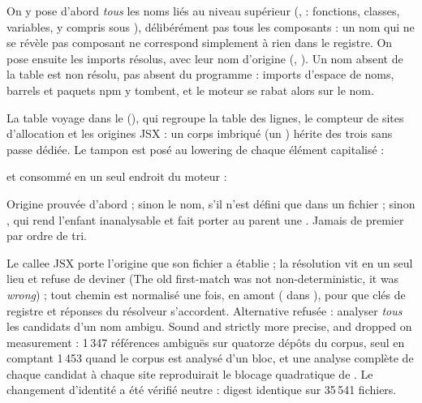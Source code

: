 
On y pose d'abord \emph{tous} les noms liés au niveau supérieur (,  : fonctions, classes, variables, y compris sous ), délibérément pas \og tous les composants\fg{} : un nom qui ne se révèle pas composant ne correspond simplement à rien dans le registre. On pose ensuite les imports résolus, avec leur nom d'origine (, ). Un nom absent de la table est \og non résolu\fg{}, pas absent du programme : imports d'espace de noms, barrels et paquets npm y tombent, et le moteur se rabat alors sur le nom.

La table voyage dans le  (), qui regroupe la table des lignes, le compteur de sites d'allocation et les origines JSX : un corps imbriqué (un ) hérite des trois sans passe dédiée. Le tampon est posé au lowering de chaque élément capitalisé :


\noindent et consommé en un seul endroit du moteur :


Origine prouvée d'abord ; sinon le nom, s'il n'est défini que dans un fichier ; sinon , qui rend l'enfant inanalysable et fait porter au parent une . Jamais de \og premier par ordre de tri\fg{}.

\begin{decision}
Le callee JSX porte l'origine que son fichier a établie ; la résolution vit en un seul lieu et refuse de deviner (\og The old first-match was not non-deterministic, it was \emph{wrong}\fg{}) ; tout chemin est normalisé une fois, en amont ( dans ), pour que clés de registre et réponses du résolveur s'accordent. Alternative refusée : analyser \emph{tous} les candidats d'un nom ambigu. \og Sound and strictly more precise, and dropped on measurement\fg{} : 1\,347 références ambiguës sur quatorze dépôts du corpus,  seul en comptant 1\,453 quand le corpus est analysé d'un bloc, et une analyse complète de chaque candidat à chaque site reproduirait le blocage quadratique de . Le changement d'identité a été vérifié neutre : digest identique sur 35\,541 fichiers.
\end{decision}

